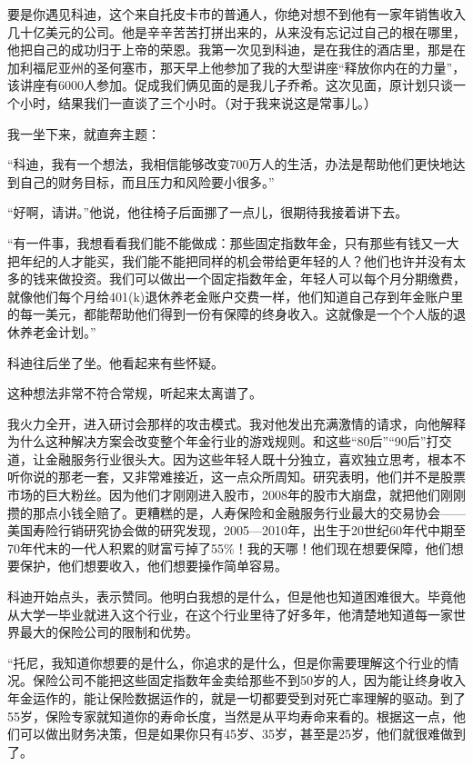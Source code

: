 要是你遇见科迪，这个来自托皮卡市的普通人，你绝对想不到他有一家年销售收入几十亿美元的公司。他是辛辛苦苦打拼出来的，从来没有忘记过自己的根在哪里，他把自己的成功归于上帝的荣恩。我第一次见到科迪，是在我住的酒店里，那是在加利福尼亚州的圣何塞市，那天早上他参加了我的大型讲座“释放你内在的力量”，该讲座有6000人参加。促成我们俩见面的是我儿子乔希。这次见面，原计划只谈一个小时，结果我们一直谈了三个小时。（对于我来说这是常事儿。）

我一坐下来，就直奔主题：

“科迪，我有一个想法，我相信能够改变700万人的生活，办法是帮助他们更快地达到自己的财务目标，而且压力和风险要小很多。”

“好啊，请讲。”他说，他往椅子后面挪了一点儿，很期待我接着讲下去。

“有一件事，我想看看我们能不能做成：那些固定指数年金，只有那些有钱又一大把年纪的人才能买，我们能不能把同样的机会带给更年轻的人？他们也许并没有太多的钱来做投资。我们可以做出一个固定指数年金，年轻人可以每个月分期缴费，就像他们每个月给401(k)退休养老金账户交费一样，他们知道自己存到年金账户里的每一美元，都能帮助他们得到一份有保障的终身收入。这就像是一个个人版的退休养老金计划。”

科迪往后坐了坐。他看起来有些怀疑。

这种想法非常不符合常规，听起来太离谱了。

我火力全开，进入研讨会那样的攻击模式。我对他发出充满激情的请求，向他解释为什么这种解决方案会改变整个年金行业的游戏规则。和这些“80后”“90后”打交道，让金融服务行业很头大。因为这些年轻人既十分独立，喜欢独立思考，根本不听你说的那老一套，又非常难接近，这一点众所周知。研究表明，他们并不是股票市场的巨大粉丝。因为他们才刚刚进入股市，2008年的股市大崩盘，就把他们刚刚攒的那点小钱全赔了。更糟糕的是，人寿保险和金融服务行业最大的交易协会——美国寿险行销研究协会做的研究发现，2005—2010年，出生于20世纪60年代中期至70年代末的一代人积累的财富亏掉了55\%！我的天哪！他们现在想要保障，他们想要保护，他们想要收入，他们想要操作简单容易。

科迪开始点头，表示赞同。他明白我想的是什么，但是他也知道困难很大。毕竟他从大学一毕业就进入这个行业，在这个行业里待了好多年，他清楚地知道每一家世界最大的保险公司的限制和优势。

“托尼，我知道你想要的是什么，你追求的是什么，但是你需要理解这个行业的情况。保险公司不能把这些固定指数年金卖给那些不到50岁的人，因为能让终身收入年金运作的，能让保险数据运作的，就是一切都要受到对死亡率理解的驱动。到了55岁，保险专家就知道你的寿命长度，当然是从平均寿命来看的。根据这一点，他们可以做出财务决策，但是如果你只有45岁、35岁，甚至是25岁，他们就很难做到了。

